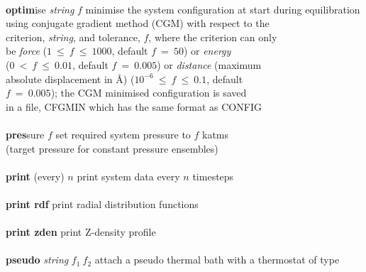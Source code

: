 \begin{tabbing}
\>                                              \> \\
\> {\bf optim}ise {\em string} $f$              \> minimise the system configuration at start during equilibration \\
\>                                              \> using conjugate gradient method (CGM) with respect to the \\
\>                                              \> criterion, {\em string}, and tolerance, $f$, where the criterion can only \\
\>                                              \> be {\em force} ($1~\le~f~\le~1000$, default $f~=~50$) or {\em energy} \\
\>                                              \> ($0~<~f~\le~0.01$, default $f~=~0.005$) or {\em distance} (maximum \\
\>                                              \> absolute displacement in \AA) ($10^{-6}~\le~f~\le~0.1$, default \\
\>                                              \> $f~=~0.005$); the CGM minimised configuration is saved \\
\>                                              \> in a file, CFGMIN which has the same format as CONFIG \\
\>                                              \> \\
\> {\bf pres}sure $f$                           \> set required system pressure to $f$ katms \\
\>                                              \> (target pressure for constant pressure ensembles) \\
\>                                              \> \\
\> {\bf print} (every) $n$                      \> print system data every $n$ timesteps \\
\>                                              \> \\
\> {\bf print rdf}                              \> print radial distribution functions \\
\>                                              \> \\
\> {\bf print zden}                             \> print Z-density profile \\
\>                                              \> \\
\> {\bf pseudo} {\em string} $f_{1}~f_{2}$      \> attach a pseudo thermal bath with a thermostat of type \\

\end{tabbing}
